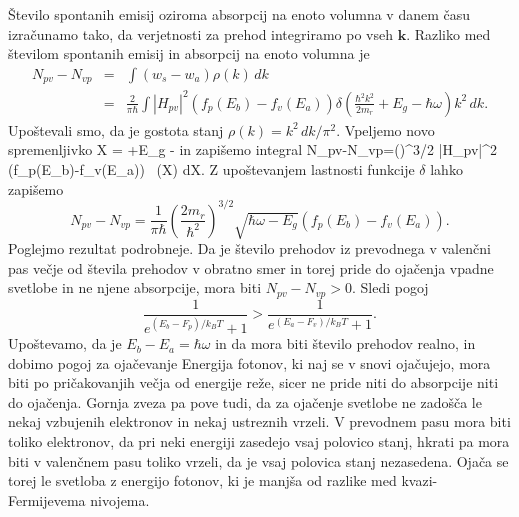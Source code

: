 Število spontanih emisij oziroma absorpcij na enoto volumna v danem času izračunamo tako,
da verjetnosti za prehod integriramo po vseh $\mathbf{k}$. Razliko med številom 
spontanih emisij in absorpcij na enoto volumna je
\begin{eqnarray}  
N_{pv}-N_{vp}&=&\int\left(w_s-w_a\right)\rho(k)\,dk  \nonumber \\
&=&\frac{2}{\pi\hbar} \int |H_{pv}|^2\left(f_p(E_b)-f_v(E_a)\right)
\delta \left(\frac{\hbar^2 k^2}{2m_r}+E_g -\hbar\omega\right) k^2\,dk.
\label{6.7}
\end{eqnarray}
Upoštevali smo, da je gostota stanj $\rho(k)=k^2\, dk/\pi^2$. Vpeljemo
novo spremenljivko 
\beq
X = +E_g -\hbar\omega
\eeq
in zapišemo integral
\beq
N_{pv}-N_{vp}=\left(\right)^{3/2} 
\int |H_{pv}|^2 \left(f_p(E_b)-f_v(E_a)\right)
\,
\delta (X) dX.
\label{6.7a}
\eeq
Z upoštevanjem lastnosti funkcije $\delta$ lahko zapišemo
\begin{equation}  
N_{pv}-N_{vp}=\frac{1}{\pi\hbar}\left(\frac{2m_r}{\hbar^2}\right)^{3/2}
\sqrt{\hbar \omega-E_g}\left(f_p(E_b)-f_v(E_a)\right).
\label{6.11}
\end{equation}
Poglejmo rezultat podrobneje. Da je število prehodov iz prevodnega v valenčni pas
večje od števila prehodov v obratno smer in torej pride do ojačenja vpadne svetlobe 
in ne njene absorpcije, mora biti $N_{pv}-N_{vp} >0$. Sledi pogoj
\begin{equation}  
\frac{1}{e^{(E_b-F_{p})/k_B T}+1}>\frac{1}{e^{(E_a-F_v)/k_B T}+1}.
\label{6.12}
\end{equation}
Upoštevamo, da je $E_b-E_a = \hbar \omega$ in da mora biti število prehodov realno, in
dobimo pogoj za ojačevanje 
Energija fotonov, ki naj se v snovi ojačujejo, mora biti po pričakovanjih večja od
energije reže, sicer ne pride niti do absorpcije niti do ojačenja. Gornja zveza pa pove tudi, 
da za ojačenje svetlobe ne zadošča le nekaj vzbujenih elektronov in nekaj ustreznih vrzeli. 
V prevodnem pasu mora biti toliko elektronov, da pri neki energiji zasedejo vsaj polovico stanj, 
hkrati pa mora biti v valenčnem pasu toliko vrzeli, da je vsaj polovica stanj nezasedena.
Ojača se torej le svetloba z energijo fotonov, ki je manjša od razlike med kvazi-Fermijevema
nivojema. 

